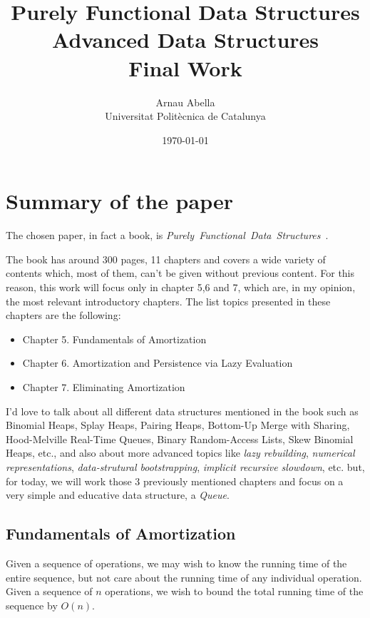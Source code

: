 \documentclass[12pt, a4paper]{article} %
\title{%
  Purely Functional Data Structures\\
  \large{Advanced Data Structures \\ Final Work}
}
\author{%
  Arnau Abella \\
  \large{Universitat Polit\`ecnica de Catalunya}
}
\date{\today}
\begin{document}
\maketitle


\section{Summary of the paper}%
\label{sec:Summary of the paper}

The chosen paper, in fact a book, is \mbox{\textit{Purely Functional Data Structures} \cite{oka98}}.

The book has around 300 pages, 11 chapters and covers a wide variety of contents which, most of them, can't be given without previous content. For this reason, this work will focus only in chapter 5,6 and 7, which are, in my opinion, the most relevant introductory chapters. The list topics presented in these chapters are the following:

\begin{itemize}
  \item Chapter 5. Fundamentals of Amortization
  \item Chapter 6. Amortization and Persistence via Lazy Evaluation
  \item Chapter 7. Eliminating Amortization
\end{itemize}

I'd love to talk about all different data structures mentioned in the book such as Binomial Heaps, Splay Heaps, Pairing Heaps, Bottom-Up Merge with Sharing, Hood-Melville Real-Time Queues, Binary Random-Access Lists, Skew Binomial Heaps, etc., and also about more advanced topics like \textit{lazy rebuilding}, \textit{numerical representations}, \textit{data-strutural bootstrapping}, \textit{implicit recursive slowdown}, etc. but, for today, we will work those 3 previously mentioned chapters and focus on a very simple and educative data structure, a \textit{Queue}.

\subsection{Fundamentals of Amortization}%
\label{sub:Fundamentals of Amortization}

Given a sequence of operations, we may wish to know the running time of the entire sequence, but not care about the running time of any individual operation. Given a sequence of $n$ operations, we wish to bound the total running time of the sequence by $O(n)$.
\end{document}
